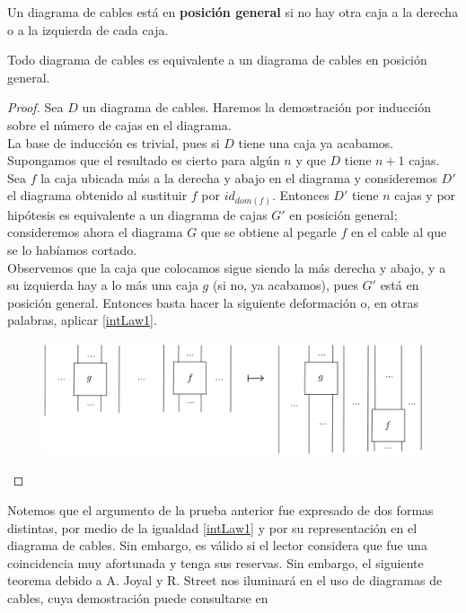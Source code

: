 \documentclass[../main.tex]{subfiles}
\begin{document}
\begin{dfn}
	Un diagrama de cables está en \textbf{posición general} si no hay otra caja a la derecha o a la izquierda de cada caja.
\end{dfn}

\begin{prop}
	Todo diagrama de cables es equivalente a un diagrama de cables en posición general. 
	\label{posgeneral}
\end{prop}
\begin{proof}
	Sea $D$ un diagrama de cables. Haremos la demostración por inducción sobre el número de cajas en el diagrama. \\
	La base de inducción es trivial, pues si $D$ tiene una caja ya acabamos. \\
	Supongamos que el resultado es cierto para algún $n$ y que $D$ tiene $n+1$ cajas. \\
	Sea $f$ la caja ubicada más a la derecha y abajo en el diagrama y consideremos $D'$ el diagrama obtenido al sustituir $f$ por $id_{dom(f)}$. Entonces $D'$ tiene $n$ cajas y por hipótesis es equivalente a un diagrama de cajas $G'$ en posición general; consideremos ahora el diagrama $G$ que se obtiene al pegarle $f$ en el cable al que se lo habíamos cortado. \\ 
    Observemos que la caja que colocamos sigue siendo la más derecha y abajo, y a su  izquierda hay a lo más una caja $g$ (si no, ya acabamos), pues $G'$ está en posición general. Entonces basta hacer la siguiente deformación o, en otras palabras, aplicar \ref{intLaw1}.
	
	\begin{figure}[H]
		\includegraphics[scale=5]{diagrama/formagen.png}
		\centering
	\end{figure}
\end{proof}
\noindent Notemos que el argumento de la prueba anterior fue expresado de dos formas distintas, por medio de la igualdad \ref{intLaw1} y por su representación en el diagrama de cables. Sin embargo, es válido si el lector considera que fue una coincidencia muy afortunada y tenga sus reservas. Sin embargo, el siguiente teorema debido a A. Joyal y R. Street  nos iluminará en el uso de diagramas de cables, cuya demostración puede consultarse en \cite{joyal88} 
\end{document}
